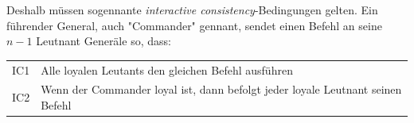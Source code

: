 \documentclass{article}
\begin{document}
Deshalb müssen sogennante \textit{interactive consistency}-Bedingungen gelten.
Ein führender General, auch "Commander" gennant, sendet einen Befehl an seine $n - 1$ Leutnant 
Generäle so, dass:

\smallskip 

\begin{tabular}{l l}
IC1 & Alle loyalen Leutants den gleichen Befehl ausführen \\
IC2 & Wenn der Commander loyal ist, dann befolgt jeder loyale Leutnant seinen Befehl
\end{tabular}

\end{document}
